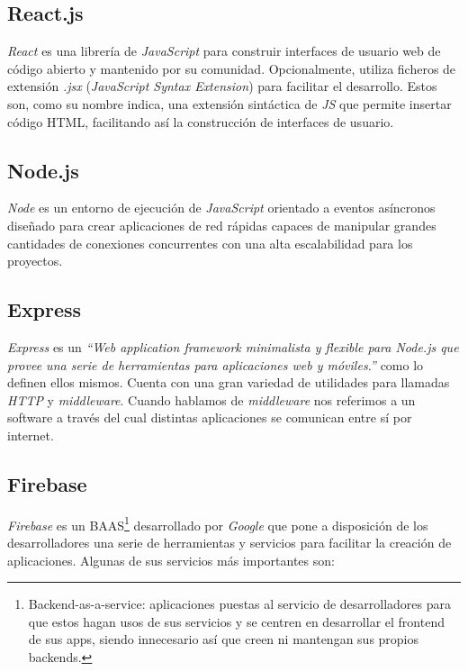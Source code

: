 \subsection{React.js}
\textit{React}\cite{react} es una librería de \textit{JavaScript} para construir interfaces de usuario web de código abierto y mantenido por su comunidad. Opcionalmente, utiliza ficheros de extensión \textit{.jsx} (\textit{JavaScript Syntax Extension}) para facilitar el desarrollo. Estos son, como su nombre indica, una extensión sintáctica de \textit{JS} que permite insertar código HTML, facilitando así la construcción de interfaces de usuario.

\subsection{Node.js}
\textit{Node}\cite{nodejs} es un entorno de ejecución de \textit{JavaScript} orientado a eventos asíncronos diseñado para crear aplicaciones de red rápidas capaces de manipular grandes cantidades de conexiones concurrentes con una alta escalabilidad para los proyectos.

\subsection{Express}
\textit{Express}\cite{express} es un \textit{``Web application framework minimalista y flexible para Node.js que provee una serie de herramientas para aplicaciones web y móviles.''} como lo definen ellos mismos. Cuenta con una gran variedad de utilidades para llamadas \textit{HTTP} y \textit{middleware}. Cuando hablamos de \textit{middleware} nos referimos a un software a través del cual distintas aplicaciones se comunican entre sí por internet. 

\subsection{Firebase}
\textit{Firebase}\cite{firebase} es un BAAS\footnote{Backend-as-a-service: aplicaciones puestas al servicio de desarrolladores para que estos hagan usos de sus servicios y se centren en desarrollar el frontend de sus apps, siendo innecesario así que creen ni mantengan sus propios backends.} desarrollado por \textit{Google} que pone a disposición de los desarrolladores una serie de herramientas y servicios para facilitar la creación de aplicaciones. Algunas de sus servicios más importantes son:

